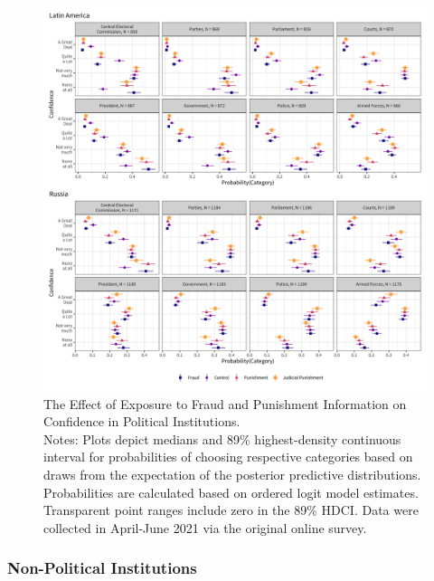 \documentclass[11pt, ngerman,english,a4]{article}
\begin{document}
\begin{figure}[H]
    \centering
    \includegraphics[width=\linewidth,trim=4 4 4 4,clip]{figs/probs_hdi89_1.png}
    \caption{The Effect of Exposure to Fraud and Punishment Information on Confidence in Political Institutions.  \\
     \footnotesize{Notes: Plots depict medians and 89\% highest-density continuous interval for probabilities of choosing respective categories based on draws from the expectation of the posterior predictive distributions. Probabilities are calculated based on ordered logit model estimates.
     Transparent point ranges include zero in the 89\% HDCI.
     Data were collected in April-June 2021 via the original online survey. } }
    \singlespacing
    \raggedright
    \label{fig:main-2}
    \end{figure}
    
% 
% 

\clearpage

\subsubsection*{Non-Political Institutions}
\end{document}
